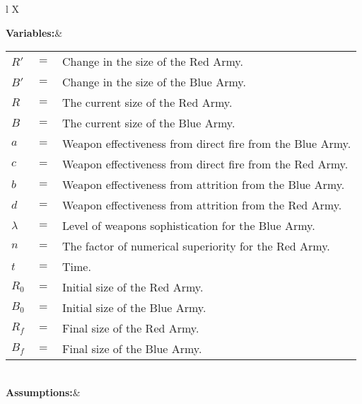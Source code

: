 \documentclass[12pt]{report}
\begin{document}
    \begin{tabularx}{\linewidth}{ l X}
        
         \textbf{Variables:}&  
         
         
         \begin{tabulary}{\linewidth}[t]{LLL}
              $R'$&$=$ & Change in the size of the Red Army.\\
              $B'$&$=$ & Change in the size of the Blue Army.\\
              $R$&$=$& The current size of the Red Army.\\
              $B$&$=$& The current size of the Blue Army.\\
              $a$&$=$ & Weapon effectiveness from direct fire from the Blue Army.\\
              $c$&$=$ & Weapon effectiveness from direct fire from the Red Army.\\
              $b$&$=$& Weapon effectiveness from attrition from the Blue Army.\\
              $d$&$=$& Weapon effectiveness from attrition from the Red Army.\\
              $\lambda$&$=$& Level of weapons sophistication for the Blue Army.\\
              $n$&$=$& The factor of numerical superiority for the Red Army.\\
              $t$&$=$& Time.\\ 
              $R_0$&$=$& Initial size of the Red Army.\\
              $B_0$&$=$& Initial size of the Blue Army.\\
              $R_f$&$=$& Final size of the Red Army.\\
              $B_f$&$=$& Final size of the Blue Army.\\
              
         \end{tabulary}
        
         \\
        
         \textbf{Assumptions:}&
         

\end{tabularx}
\end{document}
